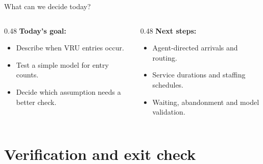 \documentclass{beamer}
\begin{document}
\begin{frame}{What can we decide today?}
  \begin{columns}[T]
    \begin{column}{0.48\textwidth}
      \textbf{Today's goal:} 
      \begin{itemize}
        \item Describe when VRU entries occur.
        \item Test a simple model for entry counts.
        \item Decide which assumption needs a better check.
      \end{itemize}
    \end{column}
    \begin{column}{0.48\textwidth}
      \textbf{Next steps:}
      \begin{itemize}
        \item Agent-directed arrivals and routing.
        \item Service durations and staffing schedules.
        \item Waiting, abandonment and model validation.
      \end{itemize}
    \end{column}
  \end{columns}
\end{frame}

\section{Verification and exit check}
\end{document}

